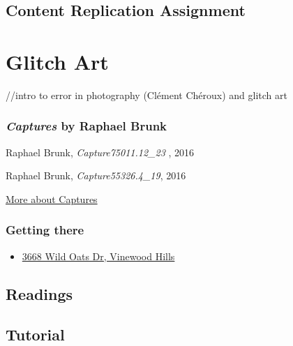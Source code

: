 \documentclass[
  openany]{book}
\providecommand{\tightlist}{%
  \setlength{\itemsep}{0pt}\setlength{\parskip}{0pt}}
\begin{document}
\hypertarget{content-replication-assignment-5}{%
\section*{Content Replication Assignment}\label{content-replication-assignment-5}}

\hypertarget{glitch-art}{%
\chapter{Glitch Art}\label{glitch-art}}

//intro to error in photography (Clément Chéroux) and glitch art

\hypertarget{captures-by-raphael-brunk}{%
\subsection*{\texorpdfstring{\emph{Captures} by Raphael Brunk}{Captures by Raphael Brunk}}\label{captures-by-raphael-brunk}}

Raphael Brunk, \emph{Capture75011.12\_23 }, 2016

Raphael Brunk, \emph{Capture55326.4\_19}, 2016

\href{http://www.darktaxa-project.net/artists/raphael-brunk/}{More about Captures}

\hypertarget{getting-there-9}{%
\subsection*{Getting there}\label{getting-there-9}}

\begin{itemize}
\tightlist
\item
  \href{https://grandtheftdata.com/landmarks/\#-94.207,530.818,5,atlas,name=3668,3668_Wild_Oats_Dr,_Vinewood_Hills}{3668 Wild Oats Dr, Vinewood Hills}
\end{itemize}

\hypertarget{readings-6}{%
\section*{Readings}\label{readings-6}}

\hypertarget{tutorial-6}{%
\section*{Tutorial}\label{tutorial-6}}
\end{document}
